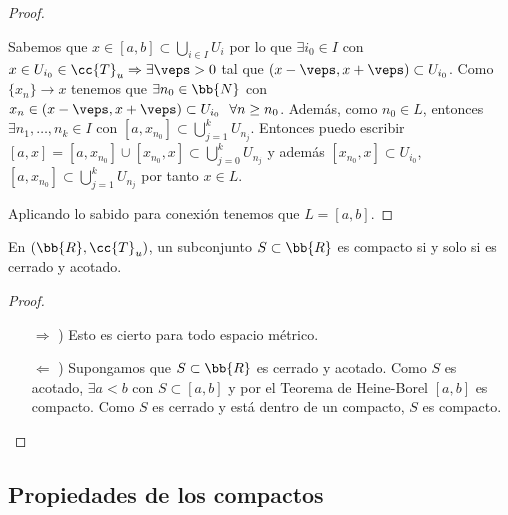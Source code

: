 \begin{teo}
\begin{proof}
\begin{enumerate}
            Sabemos que $x\in [a,b]\subset \bigcup\limits_{i\in I}U_i$ por lo que $\exists i_0\in I$ con $x\in U_{i_0}\in \cc{T}_u \Rightarrow \exists \veps >0$ tal que $(x-\veps, x+\veps)\subset U_{i_0}$. Como $\{x_n\}\to x$ tenemos que $\exists n_0\in \bb{N}$ con $x_n\in (x-\veps, x+\veps)\subset U_{i_0}\ \ \forall n\geq n_0$. Además, como $n_0\in L$, entonces $\exists n_1,\dots,n_k\in I$ con $[a,x_{n_0}]\subset \bigcup\limits_{j=1}^k U_{n_j}$. Entonces puedo escribir $[a,x]=[a,x_{n_0}]\cup[x_{n_0}, x]\subset \bigcup\limits_{j=0}^k U_{n_j}$ y además $[x_{n_0},x]\subset U_{i_0}$, $[a,x_{n_0}]\subset \bigcup\limits_{j=1}^k U_{n_j}$ por tanto $x\in L$.

        \end{enumerate}
        Aplicando lo sabido para conexión tenemos que $L=[a,b]$.

    \end{proof}
\end{teo}

\begin{coro}
    En $(\bb{R}, \cc{T}_u)$, un subconjunto $S\subset \bb{R}$ es compacto si y solo si es cerrado y acotado.
    \begin{proof}\
        \begin{itemize}
            \item[$\Rightarrow$ )] Esto es cierto para todo espacio métrico.
            \item[$\Leftarrow$ )] Supongamos que $S\subset \bb{R}$ es cerrado y acotado. Como $S$ es acotado, $\exists a<b$ con $S\subset [a,b]$ y por el Teorema de Heine-Borel $[a,b]$ es compacto. Como $S$ es cerrado y está dentro de un compacto, $S$ es compacto. 
        \end{itemize}
    \end{proof}
\end{coro}

\subsection{Propiedades de los compactos}

